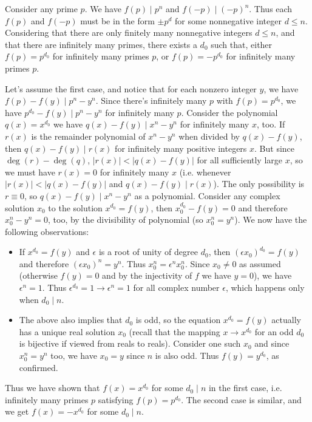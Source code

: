 \documentclass[11pt,a4paper]{article}
\begin{document}
\begin{enumerate}
	Consider any prime $p$. We have $f(p)\mid p^n$ and $f(-p)\mid (-p)^n$. Thus each $f(p)$ and $f(-p)$ must be in the form $\pm p^d$ for some nonnegative integer $d\le n$. 
	Considering that there are only finitely many nonnegative integers $d\le n$, and that there are infinitely many primes, there exists a $d_0$ such that, either $f(p)=p^{d_0}$ for infinitely many primes $p$, or $f(p)=-p^{d_0}$ for infinitely many primes $p$. 
	
	Let's assume the first case, and notice that for each nonzero integer $y$, we have $f(p)-f(y)\mid p^n-y^n$. 
	Since there's infinitely many $p$ with $f(p)=p^{d_0}$, we have $p^{d_0}-f(y)\mid p^n-y^n$ for infinitely many $p$. Consider the polynomial $q(x)=x^{d_0}$ we have $q(x)-f(y)\mid x^n-y^n$ for infinitely many $x$, too. If $r(x)$ is the remainder polynomial of $x^n-y^n$ when divided by $q(x)-f(y)$, then $q(x)-f(y)\mid r(x)$ for infinitely many positive integers $x$. But since $\deg(r)-\deg(q)$, $|r(x)|<|q(x)-f(y)|$ for all sufficiently large $x$, so we must have $r(x)=0$ for infinitely many $x$ (i.e. whenever $|r(x)|<|q(x)-f(y)|$ and $q(x)-f(y)\mid r(x)$). The only possibility is $r\equiv 0$, so $q(x)-f(y)\mid x^n-y^n$ as a polynomial. 
	Consider any complex solution $x_0$ to the solution $x^{d_0}=f(y)$, then $x_0^{d_0}-f(y)=0$ and therefore $x_0^n-y^n=0$, too, by the divisibility of polynomial (so $x_0^n=y^n$). We now have the following observations: 
	\begin{itemize}
		\item If $x^{d_0}=f(y)$ and $\epsilon$ is a root of unity of degree $d_0$, then $(\epsilon x_0)^{d_0}=f(y)$ and therefore $(\epsilon x_0)^{n}=y^n$. Thus $x_0^{n}=\epsilon^nx_0^n$. Since $x_0\neq 0$ as assumed (otherwise $f(y)=0$ and by the injectivity of $f$ we have $y=0$), we have $\epsilon^n=1$. Thus $\epsilon^{d_0}=1\to \epsilon^n=1$ for all complex number $\epsilon$, which happens only when $d_0\mid n$. 
		
		\item The above also implies that $d_0$ is odd, so the equation $x^{d_0}=f(y)$ actually has a unique real solution $x_0$ (recall that the mapping $x\to x^{d_0}$ for an odd $d_0$ is bijective if viewed from reals to reals). Consider one such $x_0$ and since $x_0^n=y^n$ too, we have $x_0=y$ since $n$ is also odd. Thus $f(y)=y^{d_0}$, as confirmed. 
		
	\end{itemize}
	Thus we have shown that $f(x)=x^{d_0}$ for some $d_0\mid n$ in the first case, i.e. infinitely many primes $p$ satisfying $f(p)=p^{d_0}$. The second case is similar, and we get $f(x)=-x^{d_0}$ for some $d_0\mid n$. 
	

\end{enumerate}
\end{document}
